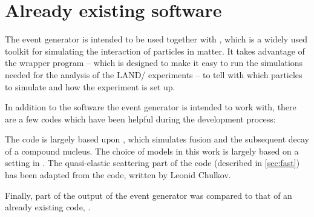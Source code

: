 %
\section{Already existing software}
The event generator is intended to be used together with , which is a widely used toolkit for simulating the interaction of particles in matter\cite{allison:2006:art}. It takes advantage of the wrapper program \cite{johansson:2013:online} -- which is designed to make it easy to run the simulations needed for the analysis of the LAND/\rtb{} experiments -- to tell with  which particles to simulate and how the experiment is set up.

In addition to the software the event generator is intended to work with, there are a few codes which have been helpful during the development process:

The code is largely based upon \cite{gollerthan:1988:thesis}, which simulates fusion and the subsequent decay of a compound nucleus. The choice of models in this work is largely based on a setting in .
The quasi-elastic scattering part of the code (described in \autoref{sec:fast}) has been adapted from the  code, written by Leonid Chulkov.

Finally, part of the output of the event generator was compared to that of an already existing code, \cite{talys:2015}. 